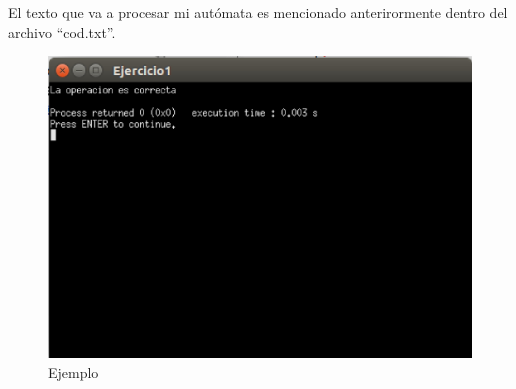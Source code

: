 \documentclass[a4paper,12pt]{article}
\begin{document}
El texto que va a procesar mi autómata es mencionado anterirormente dentro del archivo ``cod.txt''.

\begin{figure}[h]
 \centering
 \includegraphics[scale = 0.33]{1.eps}
 \caption{Ejemplo}
\end{figure}
\end{document}

